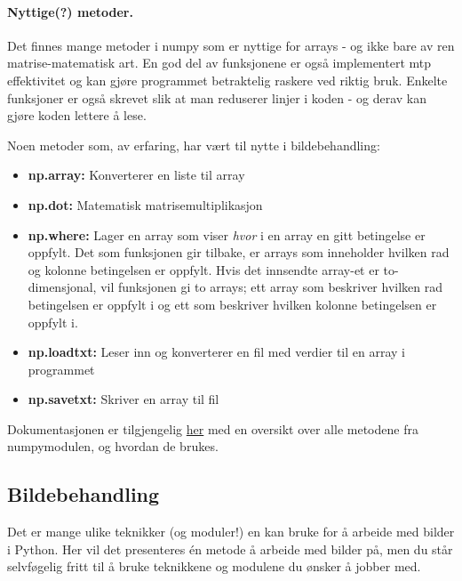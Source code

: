 \documentclass[%
oneside,                 %
final,                   %
10pt]{article}
\begin{document}
\paragraph{Nyttige(?) metoder.}
Det finnes mange metoder i numpy som er nyttige for arrays - og ikke bare av ren matrise-matematisk art.
En god del av funksjonene er også implementert mtp effektivitet og kan gjøre programmet betraktelig raskere ved riktig bruk.
Enkelte funksjoner er også skrevet slik at man reduserer linjer i koden - og derav kan gjøre koden lettere å lese.



\vspace{3mm}


Noen metoder som, av erfaring, har vært til nytte i bildebehandling:
\begin{itemize}
\item \textbf{np.array:} Konverterer en liste til array

\item \textbf{np.dot:} Matematisk matrisemultiplikasjon

\item \textbf{np.where:} Lager en array som viser \emph{hvor} i en array en gitt betingelse er oppfylt. Det som funksjonen gir tilbake, er arrays som inneholder hvilken rad og kolonne betingelsen er oppfylt. Hvis det innsendte array-et er to-dimensjonal, vil funksjonen gi to arrays; ett array som beskriver hvilken rad betingelsen er oppfylt i og ett som beskriver hvilken kolonne betingelsen er oppfylt i.

\item \textbf{np.loadtxt:} Leser inn og konverterer en fil med verdier til en array i programmet

\item \textbf{np.savetxt:} Skriver en array til fil
\end{itemize}

\noindent
Dokumentasjonen er tilgjengelig \href{{https://docs.scipy.org/doc/numpy/reference/}}{her} med en oversikt over alle metodene fra numpymodulen, og hvordan de brukes.


\subsection{Bildebehandling}
Det er mange ulike teknikker (og moduler!) en kan bruke for å arbeide med bilder i Python. Her vil det presenteres én metode å arbeide med bilder på, men
du står selvføgelig fritt til å bruke teknikkene og modulene du ønsker å jobber med.
\end{document}
